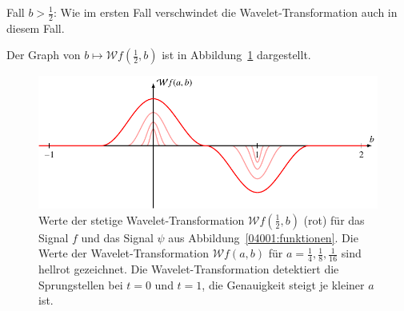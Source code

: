 \begin{loesung}
\begin{teilaufgaben}
\begin{enumerate}
Fall $b > \frac12$:
Wie im ersten Fall verschwindet die Wavelet-Transformation auch in diesem
Fall.
\end{enumerate}
Der Graph von $b\mapsto \mathcal{W}f(\frac12,b)$ ist in
Abbildung~\ref{04001:wavelet2} dargestellt.
\begin{figure}
\centering
%
%
\includegraphics{chapters/uebungsaufgaben/04001-W.pdf}
\caption{Werte der stetige Wavelet-Transformation $\mathcal{W}f(\frac12,b)$
(rot)
für das Signal $f$ und das Signal $\psi$ aus Abbildung~\ref{04001:funktionen}.
Die Werte der Wavelet-Transformation $\mathcal{W}f(a,b)$ für
$a=\frac14,\frac18,\frac1{16}$ sind hellrot gezeichnet.
Die Wavelet-Transformation detektiert die Sprungstellen bei $t=0$ und
$t=1$, die Genauigkeit steigt je kleiner $a$ ist.
\label{04001:wavelet2}}
\end{figure}
%

\end{teilaufgaben}
\end{loesung}
